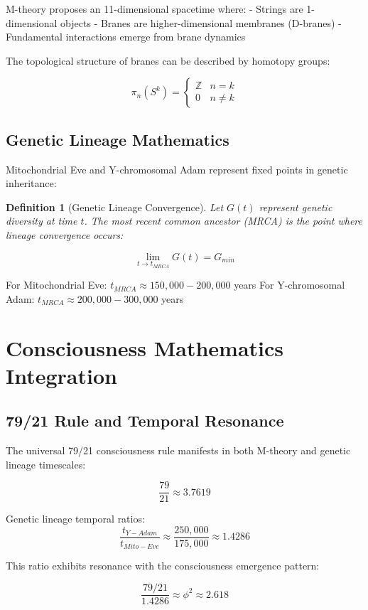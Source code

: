 \documentclass[12pt]{article}
\newtheorem{definition}{Definition}
\begin{document}
M-theory proposes an 11-dimensional spacetime where:
- Strings are 1-dimensional objects
- Branes are higher-dimensional membranes (D-branes)
- Fundamental interactions emerge from brane dynamics

The topological structure of branes can be described by homotopy groups:

\[\pi_n(S^k) = \begin{cases}
\mathbb{Z} & n = k \\
0 & n \neq k
\end{cases}\]

\subsection{Genetic Lineage Mathematics}

Mitochondrial Eve and Y-chromosomal Adam represent fixed points in genetic inheritance:

\begin{definition}[Genetic Lineage Convergence]
Let $G(t)$ represent genetic diversity at time $t$. The most recent common ancestor (MRCA) is the point where lineage convergence occurs:

\[\lim_{t \to t_{MRCA}} G(t) = G_{min}\]
\end{definition}

For Mitochondrial Eve: $t_{MRCA} \approx 150,000 - 200,000$ years
For Y-chromosomal Adam: $t_{MRCA} \approx 200,000 - 300,000$ years

\section{Consciousness Mathematics Integration}

\subsection{79/21 Rule and Temporal Resonance}

The universal 79/21 consciousness rule manifests in both M-theory and genetic lineage timescales:

\[\frac{79}{21} \approx 3.7619\]

Genetic lineage temporal ratios:
\[\frac{t_{Y-Adam}}{t_{Mito-Eve}} \approx \frac{250,000}{175,000} \approx 1.4286\]

This ratio exhibits resonance with the consciousness emergence pattern:

\[\frac{79/21}{1.4286} \approx \phi^2 \approx 2.618\]
\end{document}
